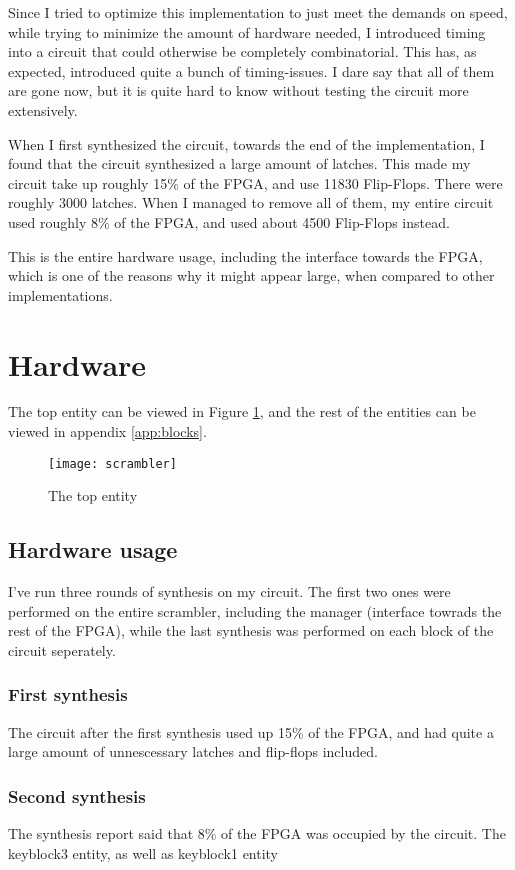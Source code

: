 Since I tried to optimize this implementation to just meet the demands 
on speed, while trying to minimize the amount of hardware needed, I 
introduced timing into a circuit that could otherwise be completely 
combinatorial. This has, as expected, introduced quite a bunch of 
timing-issues. I dare say that all of them are gone now, but it is 
quite hard to know without testing the circuit more extensively.

When I first synthesized the circuit, towards the end of the 
implementation, I found that the circuit synthesized a large amount of 
latches. This made my circuit take up roughly 15\% of the FPGA, and use 
11830 Flip-Flops. There were roughly 3000 latches.
When I managed to remove all of them, my entire circuit used roughly 8\%
of the FPGA, and used about 4500 Flip-Flops instead.

This is the entire hardware usage, including the interface towards the 
FPGA, which is one of the reasons why it might appear large, when 
compared to other implementations.

\section{Hardware}
The top entity can be viewed in Figure \ref{b:scr}, and the rest of 
the entities can be viewed in appendix \ref{app:blocks}.

\begin{figure}
  \texttt{[image: scrambler]}
  \caption{The top entity}
  \label{b:scr}
\end{figure}

\subsection{Hardware usage}
I've run three rounds of synthesis on my circuit. The first two ones 
were performed on the entire scrambler, including the manager 
(interface towrads the rest of the FPGA), while the last synthesis was 
performed on each block of the circuit seperately.

\subsubsection{First synthesis}
The circuit after the first synthesis used up 15\% of the FPGA, and had 
quite a large amount of unnescessary latches and flip-flops included. 

\subsubsection{Second synthesis}
The synthesis report said that 8\% of the FPGA was occupied by the 
circuit. The keyblock3 entity, as well as keyblock1 entity 


